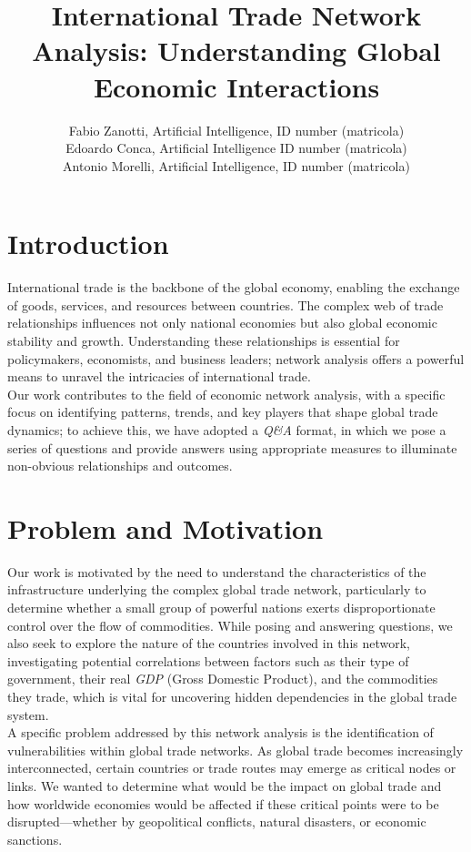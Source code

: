 \documentclass[12pt, a4paper]{article}
\author{Fabio Zanotti, Artificial Intelligence, ID number (matricola)
\\Edoardo Conca,  Artificial Intelligence ID number (matricola)
\\Antonio Morelli, Artificial Intelligence, ID number (matricola)}
\date{}
\title{International Trade Network Analysis: Understanding Global Economic Interactions}
\begin{document}
\maketitle

\section{Introduction}
\label{introduction}

International trade is the backbone of the global economy, enabling the exchange of goods, services, and resources between countries. The complex web of trade relationships influences not only national economies but also global economic stability and growth. Understanding these relationships is essential for policymakers, economists, and business leaders; network analysis offers a powerful means to unravel the intricacies of international trade.\\

Our work contributes to the field of economic network analysis, with a specific focus on identifying patterns, trends, and key players that shape global trade dynamics; to achieve this, we have adopted a \textit{Q\&A} format, in which we pose a series of questions and provide answers using appropriate measures to illuminate non-obvious relationships and outcomes.

\section{Problem and Motivation}
\label{problem-and-motivation}

Our work is motivated by the need to understand the characteristics of the infrastructure underlying the complex global trade network, particularly to determine whether a small group of powerful nations exerts disproportionate control over the flow of commodities. While posing and answering questions, we also seek to explore the nature of the countries involved in this network, investigating potential correlations between factors such as their type of government, their real \textit{GDP} (Gross Domestic Product), and the commodities they trade, which is vital for uncovering hidden dependencies in the global trade system.\\

A specific problem addressed by this network analysis is the identification of vulnerabilities within global trade networks. As global trade becomes increasingly interconnected, certain countries or trade routes may emerge as critical nodes or links. We wanted to determine what would be the impact on global trade and how worldwide economies would be affected if these critical points were to be disrupted—whether by geopolitical conflicts, natural disasters, or economic sanctions.
\end{document}
